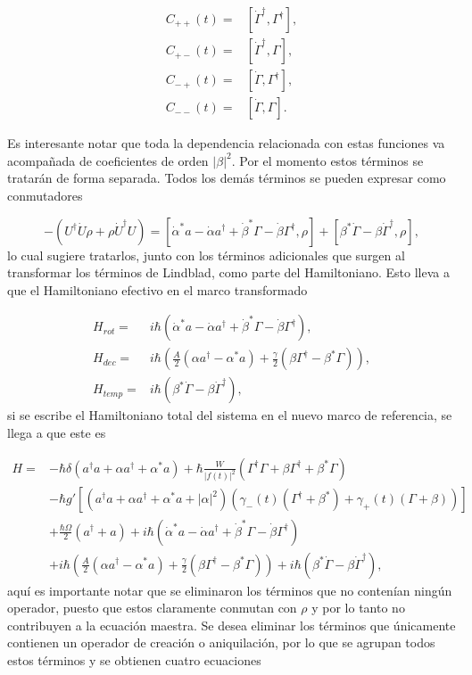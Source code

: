 \documentclass[a4paper,10pt]{report}
\begin{document}
\begin{align*}
C_{++}(t) =& [\dot{\Gamma}^{\dagger}, \Gamma^{\dagger}],\\
C_{+-}(t) =& [\dot{\Gamma}^{\dagger}, \Gamma],\\
C_{-+}(t) =& [\dot{\Gamma}, \Gamma^{\dagger}],\\
C_{--}(t) =& [\dot{\Gamma}, \Gamma].
\end{align*} 
 
Es interesante notar que toda la dependencia relacionada con estas funciones va acompañada de coeficientes de orden $|\beta|^2$. Por el momento estos términos se tratarán de forma separada. Todos los demás términos se pueden expresar como conmutadores

\begin{equation}
-(U^{\dagger}\dot{U}\rho + \rho \dot{U}^\dagger U) = [\dot{\alpha}^*a-\dot{\alpha}a^\dagger+\dot{\beta}^*\Gamma-\dot{\beta}\Gamma^\dagger,\rho]+ [\beta^*\dot{\Gamma} - \beta \dot{\Gamma}^\dagger,\rho],
\end{equation} lo cual sugiere tratarlos, junto con los términos adicionales que surgen al transformar los términos de Lindblad, como parte del Hamiltoniano. Esto lleva a que el Hamiltoniano efectivo en el marco transformado 

\begin{align}
H_{rot} =& i\hbar(\dot{\alpha}^*a-\dot{\alpha}a^\dagger+\dot{\beta}^*\Gamma-\dot{\beta}\Gamma^\dagger),\\
H_{dec} =& i\hbar(\frac{A}{2}(\alpha a^\dagger - \alpha^*a)+\frac{\gamma}{2}(\beta\Gamma^{\dagger}-\beta^* \Gamma)),\\
H_{temp}=& i\hbar(\beta^*\dot{\Gamma} - \beta \dot{\Gamma}^\dagger),
\end{align} si se escribe el Hamiltoniano total del sistema en el nuevo marco de referencia, se llega a que este es

\begin{align*}
H =& -\hbar \delta(a^{\dagger}a +\alpha a^{\dagger}+\alpha^* a)+\hbar\frac{W}{|f(t)|^2}(\Gamma^{\dagger}\Gamma + \beta \Gamma^{\dagger} + \beta^* \Gamma)\\
 &-\hbar g'[(a^{\dagger}a +\alpha a^{\dagger}+\alpha^* a + |\alpha|^2)(\gamma_-(t)(\Gamma^{\dagger}+\beta^*)+\gamma_+(t)(\Gamma+\beta))]\\
 &+\frac{\hbar \Omega}{2}(a^{\dagger} + a)+i\hbar(\dot{\alpha}^*a-\dot{\alpha}a^\dagger+\dot{\beta}^*\Gamma-\dot{\beta}\Gamma^\dagger)\\
 &+i\hbar(\frac{A}{2}(\alpha a^\dagger - \alpha^*a)+\frac{\gamma}{2}(\beta\Gamma^{\dagger}-\beta^* \Gamma))+i\hbar(\beta^*\dot{\Gamma} - \beta \dot{\Gamma}^\dagger),
\end{align*} aquí es importante notar que se eliminaron los términos que no contenían ningún operador, puesto que estos claramente conmutan con $\rho$ y por lo tanto no contribuyen a la ecuación maestra. Se desea eliminar los términos que únicamente contienen un operador de creación o aniquilación, por lo que se agrupan todos estos términos y se obtienen cuatro ecuaciones
\end{document}
